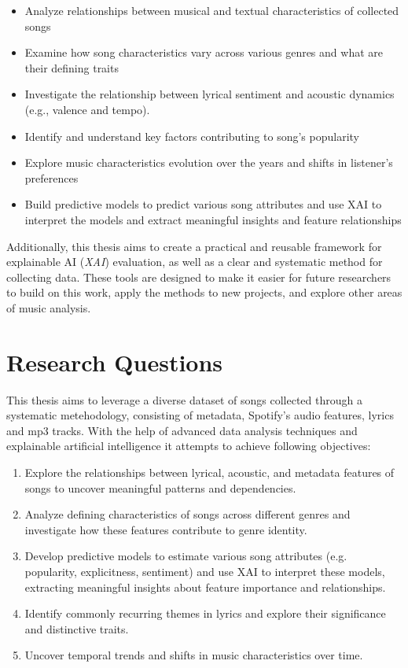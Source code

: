 \begin{itemize} 
  \item Analyze relationships between musical and textual characteristics of
    collected songs
  \item Examine how song characteristics vary across various genres and what
    are their defining traits
  \item Investigate the relationship between lyrical sentiment and acoustic
    dynamics (e.g., valence and tempo).
  \item Identify and understand key factors contributing to song's popularity
  \item Explore music characteristics evolution over the years and shifts in listener's preferences
  \item Build predictive models to predict various song attributes and use XAI
    to interpret the models and extract meaningful insights and feature
    relationships
\end{itemize}

Additionally, this thesis aims to create a practical and reusable framework for
explainable AI (\textit{XAI}) evaluation, as well as a clear and systematic
method for collecting data. These tools are designed to make it easier for
future researchers to build on this work, apply the methods to new projects,
and explore other areas of music analysis.


\section{Research Questions}
\label{sec:researchquestions}
This thesis aims to leverage a diverse dataset of songs collected through a
systematic metehodology, consisting of metadata, Spotify's audio features,
lyrics and mp3 tracks. With the help of advanced data analysis techniques and
explainable artificial intelligence it attempts to achieve following
objectives:
\begin{enumerate}
  \item Explore the relationships between lyrical, acoustic, and metadata
    features of songs to uncover meaningful patterns and dependencies.
  \item Analyze defining characteristics of songs across different genres and
    investigate how these features contribute to genre identity.
  \item Develop predictive models to estimate various song attributes (e.g.
    popularity, explicitness, sentiment) and use XAI to interpret these models,
    extracting meaningful insights about feature importance and relationships.
  \item Identify commonly recurring themes in lyrics and explore their
    significance and distinctive traits. 
  \item Uncover temporal trends and shifts in music characteristics over time.
\end{enumerate}

